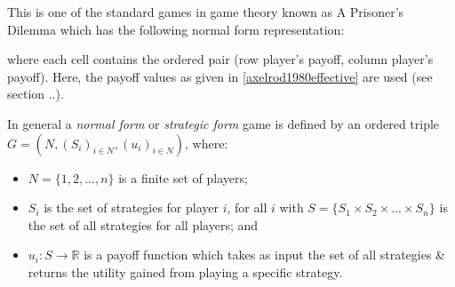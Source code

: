 This is one of the standard games in game theory known as A Prisoner's Dilemma
which has the following normal form representation:

where each cell contains the ordered pair (row player's payoff, column player's
payoff). Here, the payoff values as given in \ref{axelrod1980effective} are used
(see section ..).

In general a \textit{normal form} or \textit{strategic form} game is defined by
an ordered triple $G = (N, (S_i)_{i \in N}, (u_i)_{i \in N})$, where:
\begin{itemize}
    \item $N = \{1, 2,..., n\}$ is a finite set of players;
    \item $S_i$ is the set of strategies for player $i$, for all $i$ with $S =
        \{S_1 \times S_2 \times ... \times S_n\}$ is the set of all strategies
        for all players; and
    \item $u_i : S \to \mathbb{R}$ is a payoff function which takes as input the
    set of all strategies & returns the utility gained from playing a specific strategy.
\end{itemize}
